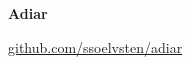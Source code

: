 \begin{frame}{} %
  \pause

  \begin{center}
    \vspace{8pt}

    {\Huge \textbf{Adiar}}

    \vspace{12pt}

    \textcolor{gray}{\small
      \href{http://github.com/ssoelvsten/adiar}{github.com/ssoelvsten/adiar}
    }
  \end{center}
\end{frame}